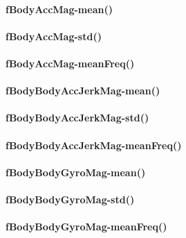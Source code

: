 \documentclass[
]{article}
\begin{document}
\hypertarget{fbodyaccmag-mean}{%
\paragraph{fBodyAccMag-mean()}\label{fbodyaccmag-mean}}

\hypertarget{fbodyaccmag-std}{%
\paragraph{fBodyAccMag-std()}\label{fbodyaccmag-std}}

\hypertarget{fbodyaccmag-meanfreq}{%
\paragraph{fBodyAccMag-meanFreq()}\label{fbodyaccmag-meanfreq}}

\hypertarget{fbodybodyaccjerkmag-mean}{%
\paragraph{fBodyBodyAccJerkMag-mean()}\label{fbodybodyaccjerkmag-mean}}

\hypertarget{fbodybodyaccjerkmag-std}{%
\paragraph{fBodyBodyAccJerkMag-std()}\label{fbodybodyaccjerkmag-std}}

\hypertarget{fbodybodyaccjerkmag-meanfreq}{%
\paragraph{fBodyBodyAccJerkMag-meanFreq()}\label{fbodybodyaccjerkmag-meanfreq}}

\hypertarget{fbodybodygyromag-mean}{%
\paragraph{fBodyBodyGyroMag-mean()}\label{fbodybodygyromag-mean}}

\hypertarget{fbodybodygyromag-std}{%
\paragraph{fBodyBodyGyroMag-std()}\label{fbodybodygyromag-std}}

\hypertarget{fbodybodygyromag-meanfreq}{%
\paragraph{fBodyBodyGyroMag-meanFreq()}\label{fbodybodygyromag-meanfreq}}
\end{document}
